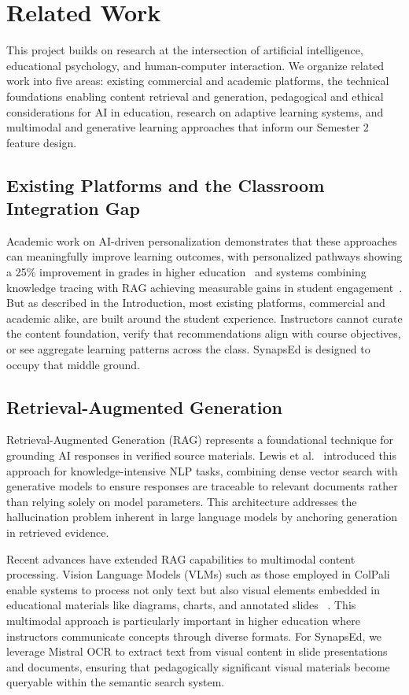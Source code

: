 \documentclass{stylefiles/capstone}
\begin{document}
\section{Related Work}
\label{sec:related}

This project builds on research at the intersection of artificial intelligence, educational psychology, and human-computer interaction. We organize related work into five areas: existing commercial and academic platforms, the technical foundations enabling content retrieval and generation, pedagogical and ethical considerations for AI in education, research on adaptive learning systems, and multimodal and generative learning approaches that inform our Semester 2 feature design.

\subsection{Existing Platforms and the Classroom Integration Gap}

Academic work on AI-driven personalization demonstrates that these approaches can meaningfully improve learning outcomes, with personalized pathways showing a 25\% improvement in grades in higher education~\cite{NaseerFawad2024Idlt} and systems combining knowledge tracing with RAG achieving measurable gains in student engagement~\cite{Li}. But as described in the Introduction, most existing platforms, commercial and academic alike, are built around the student experience. Instructors cannot curate the content foundation, verify that recommendations align with course objectives, or see aggregate learning patterns across the class. SynapsEd is designed to occupy that middle ground.

\subsection{Retrieval-Augmented Generation}

Retrieval-Augmented Generation (RAG) represents a foundational technique for grounding AI responses in verified source materials. Lewis et al.~\cite{lewis2021rag} introduced this approach for knowledge-intensive NLP tasks, combining dense vector search with generative models to ensure responses are traceable to relevant documents rather than relying solely on model parameters. This architecture addresses the hallucination problem inherent in large language models by anchoring generation in retrieved evidence.

Recent advances have extended RAG capabilities to multimodal content processing. Vision Language Models (VLMs) such as those employed in ColPali enable systems to process not only text but also visual elements embedded in educational materials like diagrams, charts, and annotated slides ~\cite{faysse2025colpaliefficientdocumentretrieval}. This multimodal approach is particularly important in higher education where instructors communicate concepts through diverse formats. For SynapsEd, we leverage Mistral OCR to extract text from visual content in slide presentations and documents, ensuring that pedagogically significant visual materials become queryable within the semantic search system.
\end{document}
